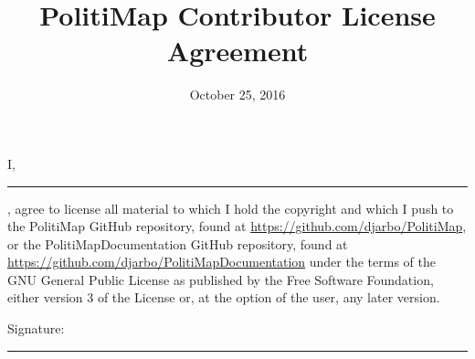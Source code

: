 \documentclass[12pt,oneside,letterpaper]{article}
\title{\bfseries PolitiMap Contributor License Agreement}
\date{October 25, 2016}
\begin{document}
\thispagestyle{empty}\maketitle
I, \rule{2in}{.5pt}, agree to license all material to which I hold the copyright and which I push to the PolitiMap GitHub repository, found at \url{https://github.com/djarbo/PolitiMap}, or the PolitiMapDocumentation GitHub repository, found at \url{https://github.com/djarbo/PolitiMapDocumentation} under the terms of the GNU General Public License as published by the Free Software Foundation, either version 3 of the License or, at the option of the user, any later version.
 
Signature:\hspace{.25in} \rule{3in}{.5pt}
\end{document}
